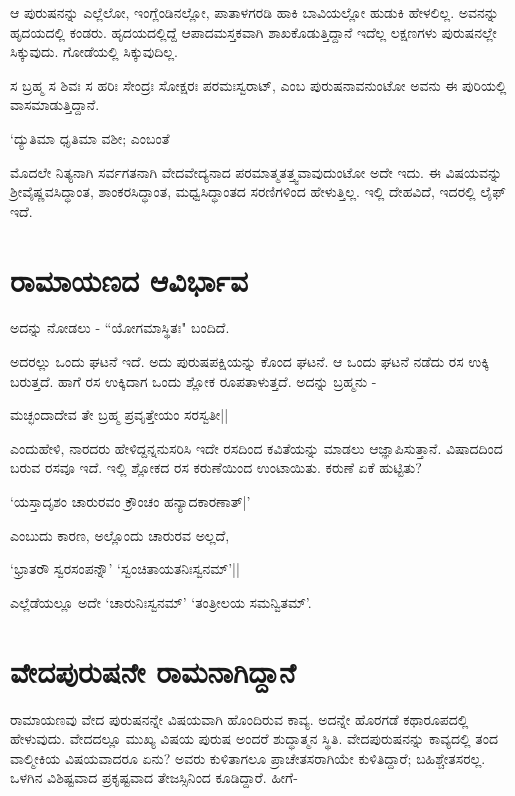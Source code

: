 ಆ ಪುರುಷನನ್ನು ಎಲ್ಲೆಲೋ, ಇಂಗ್ಲೆಂಡಿನಲ್ಲೋ, ಪಾತಾಳಗರಡಿ ಹಾಕಿ ಬಾವಿಯಲ್ಲೋ ಹುಡುಕಿ ಹೇಳಲಿಲ್ಲ. ಅವನನ್ನು ಹೃದಯದಲ್ಲಿ ಕಂಡರು. ಹೃದಯದಲ್ಲಿದ್ದೆ ಆಪಾದಮಸ್ತಕವಾಗಿ ಶಾಖಕೊಡುತ್ತಿದ್ದಾನೆ ಇದೆಲ್ಲ ಲಕ್ಷಣಗಳು ಪುರುಷನಲ್ಲೇ ಸಿಕ್ಕುವುದು. ಗೋಡೆಯಲ್ಲಿ ಸಿಕ್ಕುವುದಿಲ್ಲ. 

ಸ ಬ್ರಹ್ಮ ಸ ಶಿವಃ ಸ ಹರಿಃ ಸೇಂದ್ರಃ ಸೋಕ್ಷರಃ ಪರಮಃಸ್ವರಾಟ್, ಎಂಬ ಪುರುಷನಾವನುಂಟೋ ಅವನು ಈ ಪುರಿಯಲ್ಲಿ ವಾಸಮಾಡುತ್ತಿದ್ದಾನೆ.

\begin{shloka}
`ದ್ಯುತಿಮಾ ಧೃತಿಮಾ ವಶೀ; ಎಂಬಂತೆ 
\end{shloka}

ಮೊದಲೇ ನಿತ್ಯನಾಗಿ ಸರ್ವಗತನಾಗಿ ವೇದವೇದ್ಯನಾದ ಪರಮಾತ್ಮತತ್ತ್ವವಾವುದುಂಟೋ ಅದೇ ಇದು. ಈ ವಿಷಯವನ್ನು ಶ್ರೀವೈಷ್ಣವಸಿದ್ಧಾಂತ, ಶಾಂಕರಸಿದ್ಧಾಂತ, ಮಧ್ವಸಿದ್ಧಾಂತದ ಸರಣಿಗಳಿಂದ ಹೇಳುತ್ತಿಲ್ಲ. ಇಲ್ಲಿ ದೇಹವಿದೆ, ಇದರಲ್ಲಿ ಲೈಫ್ ಇದೆ. 

\section*{ರಾಮಾಯಣದ ಆವಿರ್ಭಾವ}

\begin{shloka}
ಅದನ್ನು ನೋಡಲು - ``ಯೋಗಮಾಸ್ಥಿತಃ" ಬಂದಿದೆ.
\end{shloka}

ಅದರಲ್ಲು ಒಂದು ಘಟನೆ ಇದೆ. ಅದು ಪುರುಷಪಕ್ಷಿಯನ್ನು ಕೊಂದ ಘಟನೆ. ಆ ಒಂದು ಘಟನೆ ನಡೆದು ರಸ ಉಕ್ಕಿ ಬರುತ್ತದೆ. ಹಾಗೆ ರಸ ಉಕ್ಕಿದಾಗ ಒಂದು ಶ್ಲೋಕ ರೂಪತಾಳುತ್ತದೆ. ಅದನ್ನು ಬ್ರಹ್ಮನು -

\begin{shloka}
ಮಚ್ಛಂದಾದೇವ ತೇ ಬ್ರಹ್ಮ ಪ್ರವೃತ್ತೇಯಂ ಸರಸ್ವತೀ||
\end{shloka}

ಎಂದುಹೇಳಿ, ನಾರದರು ಹೇಳಿದ್ದನ್ನನುಸರಿಸಿ ಇದೇ ರಸದಿಂದ ಕವಿತೆಯನ್ನು ಮಾಡಲು ಆಜ್ಞಾಪಿಸುತ್ತಾನೆ. ವಿಷಾದದಿಂದ ಬರುವ ರಸವೂ ಇದೆ. ಇಲ್ಲಿ ಶ್ಲೋಕದ ರಸ ಕರುಣೆಯಿಂದ ಉಂಟಾಯಿತು. ಕರುಣೆ ಏಕೆ ಹುಟ್ಟಿತು? 

\begin{shloka}
`ಯಸ್ತಾದೃಶಂ ಚಾರುರವಂ ಕ್ರೌಂಚಂ ಹನ್ಯಾದಕಾರಣಾತ್|'
\end{shloka}
ಎಂಬುದು ಕಾರಣ, ಅಲ್ಲೊಂದು ಚಾರುರವ ಅಲ್ಲದೆ, 
\begin{shloka}
`ಭ್ರಾತರೌ ಸ್ವರಸಂಪನ್ನೌ' `ಸ್ವಂಚಿತಾಯತನಿಃಸ್ವನಮ್'||
\end{shloka}
ಎಲ್ಲೆಡೆಯಲ್ಲೂ ಅದೇ `ಚಾರುನಿಃಸ್ವನಮ್' `ತಂತ್ರೀಲಯ ಸಮನ್ವಿತಮ್'.

\section*{ವೇದಪುರುಷನೇ ರಾಮನಾಗಿದ್ದಾನೆ}

ರಾಮಾಯಣವು ವೇದ ಪುರುಷನನ್ನೇ ವಿಷಯವಾಗಿ ಹೊಂದಿರುವ ಕಾವ್ಯ. ಅದನ್ನೇ ಹೊರಗಡೆ ಕಥಾರೂಪದಲ್ಲಿ ಹೇಳುವುದು. ವೇದದಲ್ಲೂ ಮುಖ್ಯ ವಿಷಯ ಪುರುಷ ಅಂದರೆ ಶುದ್ಧಾತ್ಮನ ಸ್ಥಿತಿ. ವೇದಪುರುಷನನ್ನು ಕಾವ್ಯದಲ್ಲಿ ತಂದ ವಾಲ್ಮೀಕಿಯ ವಿಷಯವಾದರೂ ಏನು? ಅವರು ಕುಳಿತಾಗಲೂ ಪ್ರಾಚೇತಸರಾಗಿಯೇ ಕುಳಿತಿದ್ದಾರೆ; ಬಹಿಶ್ಚೇತಸರಲ್ಲ. ಒಳಗಿನ ವಿಶಿಷ್ಟವಾದ ಪ್ರಕೃಷ್ಟವಾದ ತೇಜಸ್ಸಿನಿಂದ ಕೂಡಿದ್ದಾರೆ. ಹೀಗೆ-

